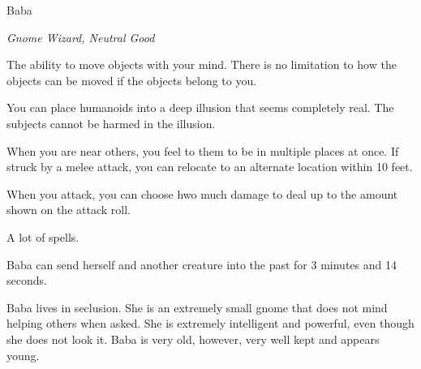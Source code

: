 \begin{monsterbox}{Baba}
	\begin{hangingpar}
		\textit{Gnome Wizard, Neutral Good}
	\end{hangingpar}
	\dndline%
	\basics[%
	armorclass = 24,
	hitpoints  = 302,
	speed      = 60 ft
	]
	\dndline%
	\stats[
	STR = \stat{8}, %
	DEX = \stat{16},
	CON = \stat{19},
	INT = \stat{26},
	WIS = \stat{24},
	CHA = \stat{21}
	]
	\dndline%
	\details[%
	languages = {Common, Elvish, Dwarvish, Gnomish, Halfling, Orc, Pandaren, Celestial, Draconic, Primordial},
	challenge = 18
	]
	\dndline%
	\begin{monsteraction}[Telekinesis]
		The ability to move objects with your mind. There is no limitation to how the objects can be moved if the objects belong to you.
	\end{monsteraction}	
	\begin{monsteraction}
		You can place humanoids into a deep illusion that seems completely real. The subjects cannot be harmed in the illusion.
	\end{monsteraction}	
	\begin{monsteraction}
		When you are near others, you feel to them to be in multiple places at once. If struck by a melee attack, you can relocate to an alternate location within 10 feet.
	\end{monsteraction}
	\begin{monsteraction}
		When you attack, you can choose hwo much damage to deal up to the amount shown on the attack roll.
	\end{monsteraction}
	\begin{monsteraction}[Spells]
		A lot of spells.
	\end{monsteraction}
	\begin{monsteraction}
		Baba can send herself and another creature into the past for 3 minutes and 14 seconds. 
	\end{monsteraction}
	Baba lives in seclusion. She is an extremely small gnome that does not mind helping others when asked. She is extremely intelligent and powerful, even though she does not look it. Baba is very old, however, very well kept and appears young.
\end{monsterbox}

